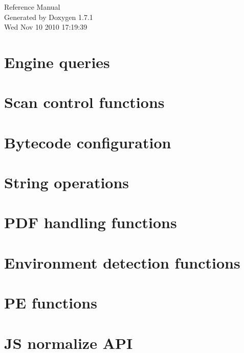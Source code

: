 \documentclass[a4paper]{article}
\begin{document}
\hypersetup{pageanchor=false}
\begin{titlepage}
\vspace*{7cm}
\begin{center}
{\Large Reference Manual}\\
\vspace*{1cm}
{\large Generated by Doxygen 1.7.1}\\
\vspace*{0.5cm}
{\small Wed Nov 10 2010 17:19:39}\\
\end{center}
\end{titlepage}
\tableofcontents
{}
\hypersetup{pageanchor=true}
\section{Engine queries}
\label{engineq}
\hypertarget{engineq}{}

\section{Scan control functions}
\label{scanc}
\hypertarget{scanc}{}

\section{Bytecode configuration}
\label{config}
\hypertarget{config}{}

\section{String operations}
\label{stringops}
\hypertarget{stringops}{}

\section{PDF handling functions}
\label{pdfg}
\hypertarget{pdfg}{}

\section{Environment detection functions}
\label{envdet}
\hypertarget{envdet}{}

\section{PE functions}
\label{pe}
\hypertarget{pe}{}

\section{JS normalize API}
\label{js}
\hypertarget{js}{}

\end{document}
